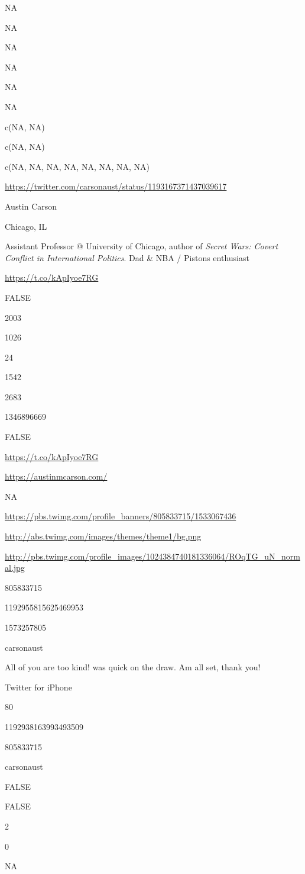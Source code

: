 \documentclass[]{book}
\begin{document}
NA

NA

NA

NA

NA

NA

c(NA, NA)

c(NA, NA)

c(NA, NA, NA, NA, NA, NA, NA, NA)

\url{https://twitter.com/carsonaust/status/1193167371437039617}

Austin Carson

Chicago, IL

Assistant Professor @ University of Chicago, author of \emph{Secret Wars: Covert Conflict in International Politics}. Dad \& NBA / Pistons enthusiast

\url{https://t.co/kApIyoe7RG}

FALSE

2003

1026

24

1542

2683

1346896669

FALSE

\url{https://t.co/kApIyoe7RG}

\url{https://austinmcarson.com/}

NA

\url{https://pbs.twimg.com/profile_banners/805833715/1533067436}

\url{http://abs.twimg.com/images/themes/theme1/bg.png}

\url{http://pbs.twimg.com/profile_images/1024384740181336064/ROqTG_uN_normal.jpg}

805833715

1192955815625469953

1573257805

carsonaust

All of you are too kind! \citet{mevers90} was quick on the draw. Am all set, thank you!

Twitter for iPhone

80

1192938163993493509

805833715

carsonaust

FALSE

FALSE

2

0

NA
\end{document}
